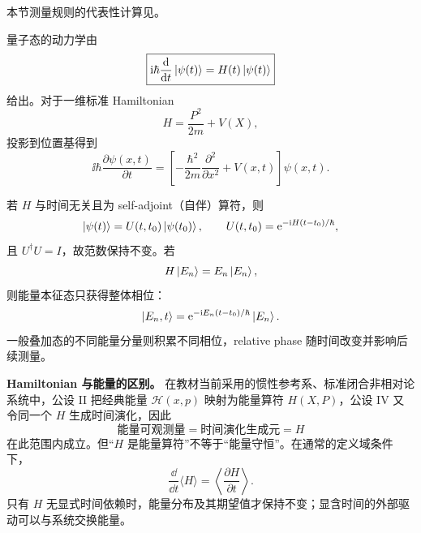本节测量规则的代表性计算见。



量子态的动力学由
\begin{equation}
  \boxed{
  \mathrm{i}\hbar\frac{\mathop{}\!\mathrm{d}}{\mathop{}\!\mathrm{d} t}\left|\psi(t)\right\rangle
  =H(t)\left|\psi(t)\right\rangle}
  \label{eq:QM-C04-S01-schrodinger-abstract}
\end{equation}
给出。对于一维标准 Hamiltonian
\begin{equation}
  H=\frac{P^2}{2m}+V(X),
  \label{eq:QM-C04-S01-standard-hamiltonian}
\end{equation}
投影到位置基得到
\begin{equation}
  \boxed{
  \ii\hbar\frac{\partial\psi(x,t)}{\partial t}
  =\left[-\frac{\hbar^2}{2m}\frac{\partial^2}{\partial x^2}
    +V(x,t)\right]\psi(x,t)}.
  \label{eq:QM-C04-S01-schrodinger-position}
\end{equation}

若 $H$ 与时间无关且为 self-adjoint（自伴）算符，则
\begin{equation}
  \left|\psi(t)\right\rangle
  =U(t,t_0)\left|\psi(t_0)\right\rangle,
  \qquad
  U(t,t_0)=\mathrm{e}^{-\mathrm{i} H(t-t_0)/\hbar},
  \label{eq:QM-C04-S01-time-evolution-operator}
\end{equation}
且 $U^\dagger U=I$，故范数保持不变。若
\[
  H\left|E_n\right\rangle=E_n\left|E_n\right\rangle,
\]
则能量本征态只获得整体相位：
\begin{equation}
  \left|E_n,t\right\rangle
  =\mathrm{e}^{-\mathrm{i} E_n(t-t_0)/\hbar}\left|E_n\right\rangle.
  \label{eq:QM-C04-S01-energy-eigenstate-evolution}
\end{equation}
一般叠加态的不同能量分量则积累不同相位，relative phase 随时间改变并影响后续测量。


\textbf{Hamiltonian 与能量的区别。}
在教材当前采用的惯性参考系、标准闭合非相对论系统中，公设 II 把经典能量 $\mathcal H(x,p)$ 映射为能量算符 $H(X,P)$，公设 IV 又令同一个 $H$ 生成时间演化，因此
\begin{equation}
  \boxed{
  \text{能量可观测量}
  =\text{时间演化生成元}
  =H}
  \label{eq:QM-C04-S01-H-standard-identification}
\end{equation}
在此范围内成立。但“$H$ 是能量算符”不等于“能量守恒”。在通常的定义域条件下，
\begin{equation}
  \frac{\dd}{\dd t}\langle H\rangle
  =\left\langle\frac{\partial H}{\partial t}\right\rangle.
  \label{eq:QM-C04-S01-energy-balance}
\end{equation}
只有 $H$ 无显式时间依赖时，能量分布及其期望值才保持不变；显含时间的外部驱动可以与系统交换能量。

